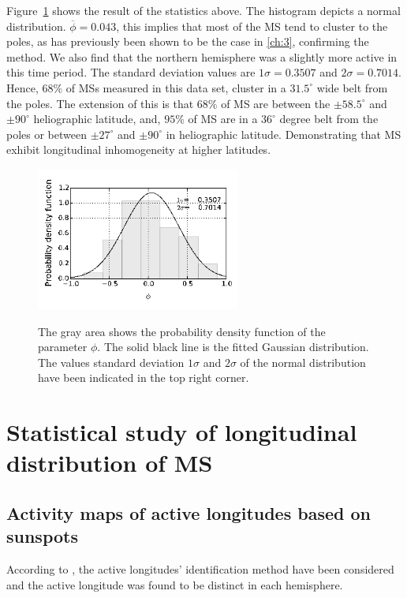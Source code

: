 Figure~\ref{ms_dis} shows the result of the statistics above. 
The histogram depicts a normal distribution. 
$\overline{\phi}=0.043$, this implies that most of the MS tend to cluster to the poles, as has previously been shown to be the case in \ref{ch:3}, confirming the method.
We also find that the northern hemisphere was a slightly more active in this time period.
The standard deviation values are $1\sigma=0.3507$ and $2\sigma=0.7014$. 
Hence, $68\%$ of MSs measured in this data set, cluster in a $31.5^{\circ}$ wide belt from the poles.
The extension of this is that $68\%$ of MS are between the $\pm58.5^{\circ}$ and $\pm90^{\circ}$ heliographic latitude, and, $95\%$ of MS are in a $36^{\circ}$ degree belt from the poles or between $\pm27^{\circ}$ and $\pm90^{\circ}$ in heliographic latitude.
Demonstrating that MS exhibit longitudinal inhomogeneity at higher latitudes.

\begin{figure}
	\centering
	{\includegraphics[width=0.6\textwidth]{Chapter4/Figs/MS_latitude_distribution}}
	{\caption{ The gray area shows the probability density function of the parameter $\phi$. The solid black line is the fitted Gaussian distribution. The values standard deviation $1\sigma$ and $2\sigma$ of the normal distribution have been indicated in the top right corner.}\label{ms_dis}}
\end{figure}

\section{Statistical study of longitudinal distribution of MS}
\subsection{Activity maps of active longitudes based on sunspots}

According to \cite{Gyenge2014}, the active longitudes' identification method have been considered and the active longitude was found to be distinct in each hemisphere. 

